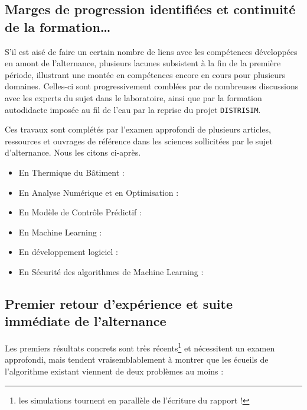\newpage
\subsection{Marges de progression identifiées et continuité de la formation…}\label{sec:marges-de-progression-identifiees-et-continuite-de-la-formation}

S'il est aisé de faire un certain nombre de liens avec les compétences développées en amont de l'alternance, plusieurs lacunes subsistent à la fin de la première période, illustrant une montée en compétences encore en cours pour plusieurs domaines.
Celles-ci sont progressivement comblées par de nombreuses discussions avec les experts du sujet dans le laboratoire, ainsi que par la formation autodidacte imposée au fil de l'eau par la reprise du projet \texttt{DISTRISIM}.

Ces travaux sont complétés par l'examen approfondi de plusieurs articles, ressources et ouvrages de référence dans les sciences sollicitées par le sujet d'alternance.
Nous les citons ci-après.
\begin{itemize}
    \item En Thermique du Bâtiment :~\cite{manuel_energie_batiment, audit_energy_engineering}
    \item En Analyse Numérique et en Optimisation :~\cite{numerical_analysis, NIA}
    \item En Modèle de Contrôle Prédictif :~\cite{MPC_needs}
    \item En Machine Learning :~\cite{WML, Goodfellow-et-al-2016, UDL}
    \item En développement logiciel :~\cite{clean_code}
    \item En Sécurité des \gls{algorithme}s de Machine Learning :~\cite{ENISA_securing_ML, ENISA_AI_standardization, ENISA_AI_cyber_research, ENISA_AI_forecasting_demand_electricity}
\end{itemize}

\subsection{Premier retour d'expérience et suite immédiate de l'alternance}\label{sec:premier-retour-d'experience-et-suite-immediate-de-l'alternance}

Les premiers résultats concrets sont très récents\footnote{les simulations tournent en parallèle de l'écriture du rapport !} et nécessitent un examen approfondi, mais tendent vraisemblablement à montrer que les écueils de l'\gls{algorithme} existant viennent de deux problèmes au moins :

